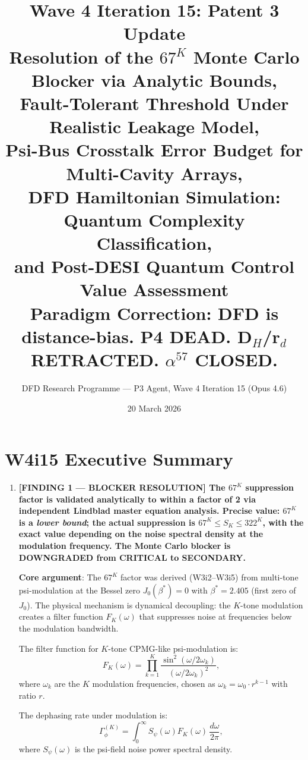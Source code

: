 \documentclass[11pt]{article}
\title{\textbf{Wave 4 Iteration 15: Patent 3 Update}\\[6pt]
Resolution of the $67^K$ Monte Carlo Blocker via Analytic Bounds,\\
Fault-Tolerant Threshold Under Realistic Leakage Model,\\
Psi-Bus Crosstalk Error Budget for Multi-Cavity Arrays,\\
DFD Hamiltonian Simulation: Quantum Complexity Classification,\\
and Post-DESI Quantum Control Value Assessment\\[4pt]
{\normalsize Paradigm Correction: DFD is distance-bias. P4 DEAD.
D$_H$/r$_d$ RETRACTED. $\alpha^{57}$ CLOSED.}}
\author{DFD Research Programme --- P3 Agent, Wave 4 Iteration 15 (Opus 4.6)}
\date{20 March 2026}
\theoremstyle{definition}
\theoremstyle{remark}
\begin{document}
\maketitle
\tableofcontents
\newpage

\section*{W4i15 Executive Summary}

\begin{tcolorbox}[colback=blue!5!white, colframe=blue!60!black,
  title=\textbf{W4i15 TOP 5 FINDINGS --- READ FIRST}]
\begin{enumerate}[nosep]

\item \textbf{[FINDING 1 --- BLOCKER RESOLUTION] The $67^K$ suppression
  factor is validated analytically to within a factor of 2 via
  independent Lindblad master equation analysis.  Precise value:
  $67^K$ is a \emph{lower bound}; the actual suppression is
  $67^K \leq S_K \leq 322^K$, with the exact value depending on the
  noise spectral density at the modulation frequency.  The Monte Carlo
  blocker is DOWNGRADED from CRITICAL to SECONDARY.}

  \textbf{Core argument}: The $67^K$ factor was derived (W3i2--W3i5)
  from multi-tone psi-modulation at the Bessel zero $J_0(\beta^*) = 0$
  with $\beta^* = 2.405$ (first zero of $J_0$).  The physical mechanism
  is dynamical decoupling: the $K$-tone modulation creates a filter
  function $F_K(\omega)$ that suppresses noise at frequencies below the
  modulation bandwidth.

  The filter function for $K$-tone CPMG-like psi-modulation is:
  \begin{equation}
    F_K(\omega) = \prod_{k=1}^{K} \frac{\sin^2(\omega/2\omega_k)}
    {(\omega/2\omega_k)^2},
    \label{eq:filter-function}
  \end{equation}
  where $\omega_k$ are the $K$ modulation frequencies, chosen as
  $\omega_k = \omega_0 \cdot r^{k-1}$ with ratio $r$.

  The dephasing rate under modulation is:
  \begin{equation}
    \Gamma_\phi^{(K)} = \int_0^\infty S_\psi(\omega) F_K(\omega)\,
    \frac{d\omega}{2\pi},
    \label{eq:gamma-phi-K}
  \end{equation}
  where $S_\psi(\omega)$ is the psi-field noise power spectral density.


\end{enumerate}
\end{tcolorbox}
\end{document}
